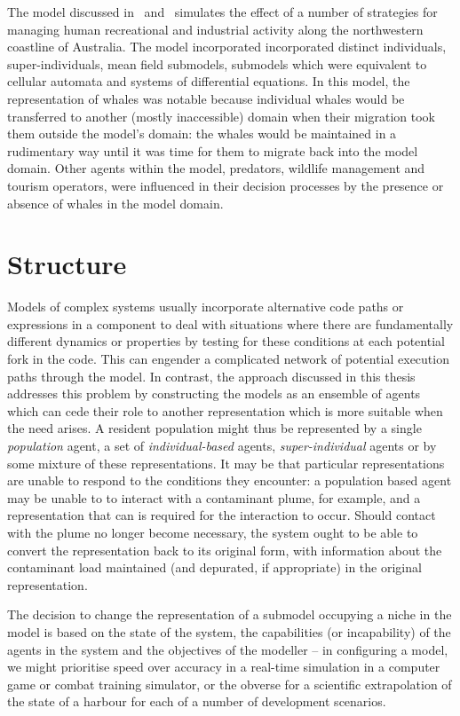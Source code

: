 The model discussed in~\cite{gray2014}
and~\cite{fulton2009crossingscales} simulates the effect of a number
of strategies for managing human recreational and industrial activity
along the northwestern coastline of Australia. The model incorporated
incorporated distinct individuals, super-individuals, mean field
submodels, submodels which were equivalent to cellular automata and
systems of differential equations. In this model, the representation
of whales was notable because individual whales would be transferred
to another (mostly inaccessible) domain when their migration took them
outside the model's domain: the whales would be maintained in a
rudimentary way until it was time for them to migrate back into the
model domain. Other agents within the model, predators, wildlife
management and tourism operators, were influenced in their decision
processes by the presence or absence of whales in the model domain.

\section{Structure }
Models of complex systems usually incorporate alternative code paths
or expressions in a component to deal with situations where there are
fundamentally different dynamics or properties by testing for these
conditions at each potential fork in the code. This can engender a
complicated network of potential execution paths through the model.
In contrast, the approach discussed in this thesis addresses this
problem by constructing the models as an ensemble of agents which can
cede their role to another representation which is more suitable when
the need arises.  A resident population might thus be represented by a
single \emph{population\/} agent, a set of \emph{individual-based\/}
agents, \emph{super-individual\/} agents or by some mixture of these
representations.  It may be that particular representations are unable
to respond to the conditions they encounter: a population based agent
may be unable to to interact with a contaminant plume, for example,
and a representation that can is required for the interaction to
occur.  Should contact with the plume no longer become necessary, the
system ought to be able to convert the representation back to its
original form, with information about the contaminant load maintained
(and depurated, if appropriate) in the original representation.

The decision to change the representation of a submodel occupying a
niche in the model is based on the state of the system, the
capabilities (or incapability) of the agents in the system and the
objectives of the modeller -- in configuring a model, we might
prioritise speed over accuracy in a real-time simulation in a computer
game or combat training simulator, or the obverse for a scientific
extrapolation of the state of a harbour for each of a number of
development scenarios.

